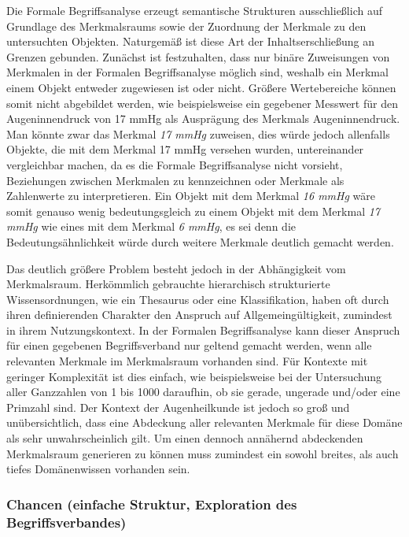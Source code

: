 \documentclass[pagesize,DIV=calc,12pt,draft]{scrreprt}
\begin{document}
Die Formale Begriffsanalyse erzeugt semantische Strukturen
ausschließlich auf Grundlage des Merkmalsraums sowie der Zuordnung der
Merkmale zu den untersuchten Objekten. Naturgemäß ist diese Art der
Inhaltserschließung an Grenzen gebunden. Zunächst ist festzuhalten, dass
nur binäre Zuweisungen von Merkmalen in der Formalen Begriffsanalyse
möglich sind, weshalb ein Merkmal einem Objekt entweder zugewiesen ist
oder nicht. Größere Wertebereiche können somit nicht abgebildet werden,
wie beispielsweise ein gegebener Messwert für den Augeninnendruck von 17
mmHg als Ausprägung des Merkmals Augeninnendruck. Man könnte zwar das
Merkmal \emph{17 mmHg} zuweisen, dies würde jedoch allenfalls Objekte,
die mit dem Merkmal 17 mmHg versehen wurden, untereinander vergleichbar
machen, da es die Formale Begriffsanalyse nicht vorsieht, Beziehungen
zwischen Merkmalen zu kennzeichnen oder Merkmale als Zahlenwerte zu
interpretieren. Ein Objekt mit dem Merkmal \emph{16 mmHg} wäre somit
genauso wenig bedeutungsgleich zu einem Objekt mit dem Merkmal \emph{17
mmHg} wie eines mit dem Merkmal \emph{6 mmHg}, es sei denn die
Bedeutungsähnlichkeit würde durch weitere Merkmale deutlich gemacht
werden.

Das deutlich größere Problem besteht jedoch in der Abhängigkeit vom
Merkmalsraum. Herkömmlich gebrauchte hierarchisch strukturierte
Wissensordnungen, wie ein Thesaurus oder eine Klassifikation, haben oft
durch ihren definierenden Charakter den Anspruch auf
Allgemeingültigkeit, zumindest in ihrem Nutzungskontext. In der Formalen
Begriffsanalyse kann dieser Anspruch für einen gegebenen Begriffsverband
nur geltend gemacht werden, wenn alle relevanten Merkmale im
Merkmalsraum vorhanden sind. Für Kontexte mit geringer Komplexität ist
dies einfach, wie beispielsweise bei der Untersuchung aller Ganzzahlen
von 1 bis 1000 daraufhin, ob sie gerade, ungerade und/oder eine Primzahl
sind. Der Kontext der Augenheilkunde ist jedoch so groß und
unübersichtlich, dass eine Abdeckung aller relevanten Merkmale für diese
Domäne als sehr unwahrscheinlich gilt. Um einen dennoch annähernd
abdeckenden Merkmalsraum generieren zu können muss zumindest ein sowohl
breites, als auch tiefes Domänenwissen vorhanden sein.

\subsubsection{Chancen (einfache Struktur, Exploration des
Begriffsverbandes)}
\end{document}
